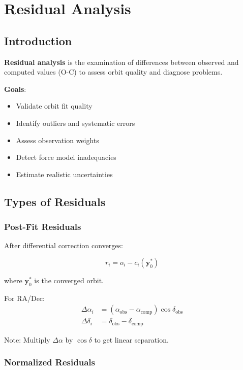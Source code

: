 \chapter{Residual Analysis}
\label{ch:residuals}

\section{Introduction}

\textbf{Residual analysis} is the examination of differences between observed and computed values (O-C) to assess orbit quality and diagnose problems.

\textbf{Goals}:
\begin{itemize}
    \item Validate orbit fit quality
    \item Identify outliers and systematic errors
    \item Assess observation weights
    \item Detect force model inadequacies
    \item Estimate realistic uncertainties
\end{itemize}

\section{Types of Residuals}

\subsection{Post-Fit Residuals}

After differential correction converges:

\begin{equation}
    r_i = o_i - c_i(\mathbf{y}_0^*)
\end{equation}

where $\mathbf{y}_0^*$ is the converged orbit.

For RA/Dec:
\begin{align}
    \Delta\alpha_i &= (\alpha_{\text{obs}} - \alpha_{\text{comp}}) \cos\delta_{\text{obs}} \\
    \Delta\delta_i &= \delta_{\text{obs}} - \delta_{\text{comp}}
\end{align}

Note: Multiply $\Delta\alpha$ by $\cos\delta$ to get linear separation.

\subsection{Normalized Residuals}

